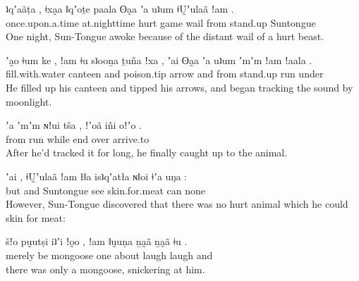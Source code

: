 \begin{exe}
 \ex 
{} {ʇqʼaãṭa} , {ǂxa̰a} {ǁqʼoṯe} {paala} {ʘa̰a} {ʼa} {uʇum} {ǂṴʼulaã} {ǃam} .\\ 
once.upon.a.time at.nighttime {} hurt game wail  from stand.up Suntongue  {}\\ 
\glt One night, Sun-Tongue awoke because of the distant wail of a hurt beast.
\end{exe}

\begin{exe}
 \ex 
{} {ʼa̰o} {ǂum} {ke} , {ǃam} {ǂu} {sʇooṉa} {ṯuña} {ǃxa} , {ʼai} {ʘa̰a} {ʼa} {uʇum} {ʼmʼm} {ǃam} {ǃaala} .\\ 
 fill.with.water canteen  {}  and poison.tip arrow  {} and  from stand.up run  under {}\\ 
\glt He filled up his canteen and tipped his arrows, and began tracking the sound by moonlight.
\end{exe}

\begin{exe}
 \ex 
{} {ʼa} {ʼmʼm} {ɴǃui} {tša} , {ǃʼoã} {iñi} {oǃʼo} .\\ 
 from run  while {} end over arrive.to {}\\ 
\glt After he'd tracked it for long, he finally caught up to the animal.
\end{exe}

\begin{exe}
 \ex 
{} {ʼai} , {ǂṴʼulaã} {ǃam} {łǁa} {isʇqʼatła} {ɴǁoi} {ǂʼa} {uŋa} :\\ 
but and {} Suntongue  see skin.for.meat can  none {}\\ 
\glt However, Sun-Tongue discovered that there was no hurt animal which he could skin for meat:
\end{exe}

\begin{exe}
 \ex 
{} {šǃo} {pṵutṣi} {iʇʼi} {ǃo̰o} , {ǃam} {ǁṵuṇa} {ṉa̰ã} {ṉa̰ã} {ǂu} .\\ 
merely be mongoose  one {}  about laugh laugh and {}\\ 
\glt there was only a mongoose, snickering at him.
\end{exe}